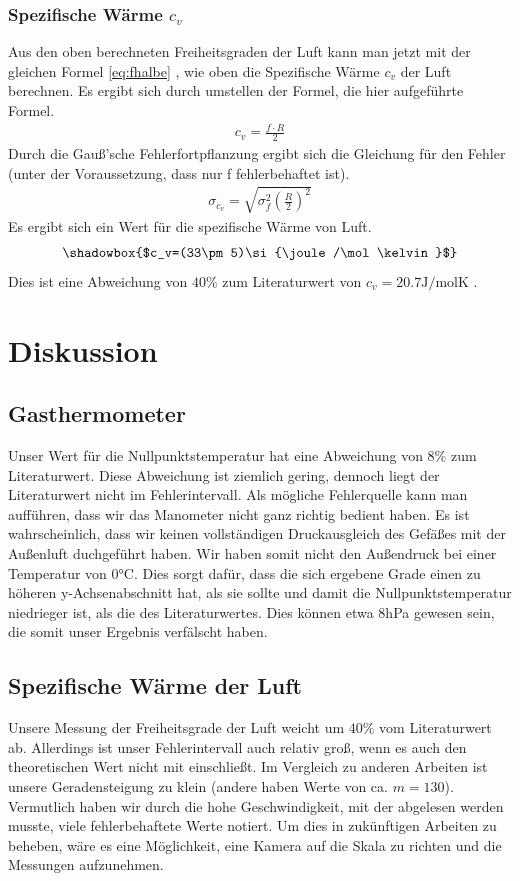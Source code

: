 \documentclass[12pt,a4paper,titlepage,headinclude,bibtotoc]{scrartcl}
\begin{document}
\subsubsection{Spezifische Wärme $c_v$}
Aus den oben berechneten Freiheitsgraden der Luft kann man jetzt mit der gleichen Formel \eqref{eq:fhalbe}
, wie oben die Spezifische Wärme $c_v$ der Luft berechnen.
Es ergibt sich durch umstellen der Formel, die hier aufgeführte Formel.
\begin{align}
	c_v=\frac{f\cdot R}{2}
\end{align}
Durch die Gauß'sche Fehlerfortpflanzung ergibt sich die Gleichung für den Fehler (unter der Voraussetzung, dass nur f fehlerbehaftet ist).
\begin{align}
	\sigma_{c_v}= \sqrt{\sigma_f^2\left(\frac{R}{2}\right)^2}
\end{align}
Es ergibt sich ein Wert für die spezifische Wärme von Luft.
$$\shadowbox{$c_v=(33\pm 5)\si{\joule/\mol\kelvin}$}$$
Dies ist eine Abweichung von $40\%$
zum Literaturwert von $c_v=20.7\si{\joule/\mol\kelvin}$ \cite[S. 260]{gerthsen}.

\section{Diskussion}
\label{sec:diskussion}
\subsection{Gasthermometer}
Unser Wert für die Nullpunktstemperatur hat eine Abweichung von 8\% zum Literaturwert.
Diese Abweichung ist ziemlich gering, dennoch liegt der Literaturwert nicht im Fehlerintervall.
Als mögliche Fehlerquelle kann man aufführen, dass wir das Manometer nicht ganz richtig bedient haben.
Es ist wahrscheinlich, dass wir keinen vollständigen Druckausgleich des Gefäßes mit der Außenluft duchgeführt haben.
Wir haben somit nicht den Außendruck bei einer Temperatur von 0\si{\celsius}.
Dies sorgt dafür, dass die sich ergebene Grade einen zu höheren y-Achsenabschnitt hat, als sie sollte und damit die Nullpunktstemperatur niedrieger ist, als die des Literaturwertes.
Dies können etwa 8hPa gewesen sein, die somit unser Ergebnis verfälscht haben.

\subsection{Spezifische Wärme der Luft}
Unsere Messung der Freiheitsgrade der Luft weicht um $40\%$ vom Literaturwert ab.
Allerdings ist unser Fehlerintervall auch relativ groß, wenn es auch den theoretischen Wert nicht mit einschließt.
Im Vergleich zu anderen Arbeiten ist unsere Geradensteigung zu klein (andere haben Werte von ca. $m=130$).
Vermutlich haben wir durch die hohe Geschwindigkeit, mit der abgelesen werden musste, viele fehlerbehaftete Werte notiert.
Um dies in zukünftigen Arbeiten zu beheben, wäre es eine Möglichkeit, eine Kamera auf die Skala zu richten und die Messungen aufzunehmen.
\end{document}
